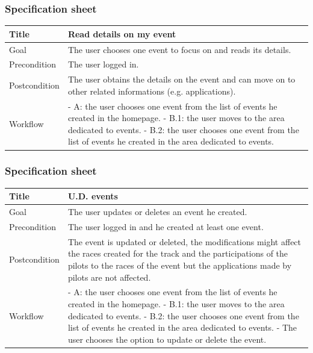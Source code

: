 \documentclass{beamer}
\begin{document}
\begin{frame}
    \frametitle{Specification sheet}
    \begin{table}
        \tiny
        \begin{tabular}{|p{2cm}|p{6cm}|}
        \hline
        Title & \textbf{Read details on my event} \\
        \hline
        Goal & The user chooses one event to focus on and reads its details. \\
        \hline
        Precondition & The user logged in. \\
        \hline
        Postcondition & The user obtains the details on the event and 
        can move on to other related informations (e.g. applications). \\
        \hline
        Workflow &
        - A: the user chooses one event from the list of events he created in the homepage. \newline
        - B.1: the user moves to the area dedicated to events. \newline
        - B.2: the user chooses one event from the list of events he created in the area dedicated to events. \\
        \hline
        \end{tabular}
\end{table}
\end{frame}


\begin{frame}
    \frametitle{Specification sheet}
    \begin{table}
        \tiny
        \begin{tabular}{|p{2cm}|p{6cm}|}
        \hline
        Title & \textbf{U.D. events} \\
        \hline
        Goal & The user updates or deletes an event he created. \\
        \hline
        Precondition & The user logged in and he created at least one event. \\
        \hline
        Postcondition & The event is updated or deleted, the modifications might affect the races created for the track 
        and the participations of the pilots to the races of the event but the applications made by pilots are not affected. \\
        \hline
        Workflow &
        - A: the user chooses one event from the list of events he created in the homepage. \newline
        - B.1: the user moves to the area dedicated to events. \newline
        - B.2: the user chooses one event from the list of events he created in the area dedicated to events. \newline
        - The user chooses the option to update or delete the event. \\
        \hline
        \end{tabular}
\end{table}
\end{frame}
\end{document}
